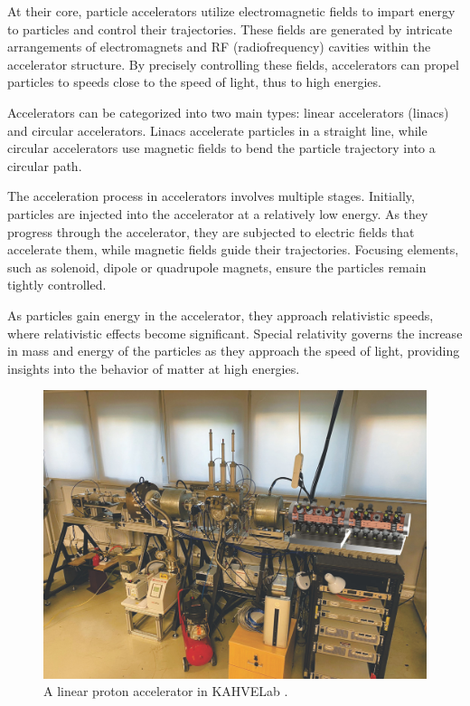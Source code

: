 \documentclass[a4paper,oneside,12pt]{report}
\numberwithin{equation}{chapter}
\begin{document}
At their core, particle accelerators utilize electromagnetic fields to impart energy to particles and control their trajectories. 
These fields are generated by intricate arrangements of electromagnets and RF (radiofrequency) cavities within the accelerator structure. 
By precisely controlling these fields, accelerators can propel particles to speeds close to the speed of light, thus to high energies.

Accelerators can be categorized into two main types: linear accelerators (linacs) and circular accelerators. 
Linacs accelerate particles in a straight line, while circular accelerators use magnetic fields to bend the particle trajectory into a circular path. 

The acceleration process in accelerators involves multiple stages. Initially, particles are injected into the accelerator at a relatively low energy. 
As they progress through the accelerator, they are subjected to electric fields that accelerate them, while magnetic fields guide their trajectories.
Focusing elements, such as solenoid, dipole or quadrupole magnets, ensure the particles remain tightly controlled.

As particles gain energy in the accelerator, they approach relativistic speeds, where relativistic effects become significant. 
Special relativity governs the increase in mass and energy of the particles as they approach the speed of light, providing insights into the behavior of matter at high energies.
\begin{figure}[H]
    \centering
    \includegraphics[width=.9\textwidth]{./figures/kahvelab_linac.png}
    \vspace{20pt}
    \caption{A linear proton accelerator in KAHVELab \cite{kahvelab_linac}.}
\end{figure}
\end{document}
